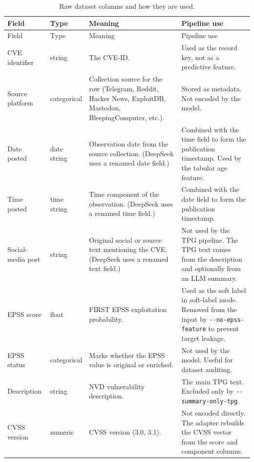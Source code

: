 \documentclass[11pt]{article}
\begin{document}
\small
\begin{longtable}{p{}p{}p{}p{}}
\caption{Raw dataset columns and how they are used.}\\
\toprule
Field & Type & Meaning & Pipeline use \\
\midrule
\endfirsthead
\toprule
Field & Type & Meaning & Pipeline use \\
\midrule
\endhead
\bottomrule
\endfoot

CVE identifier & string & The CVE-ID. & Used as the record key, not as a predictive feature. \\

Source platform & categorical & Collection source for the row (Telegram, Reddit, Hacker News, ExploitDB, Mastodon, BleepingComputer, etc.). & Stored as metadata. Not encoded by the model. \\

Date posted & date string & Observation date from the source collection. (DeepSeek uses a renamed date field.) & Combined with the time field to form the publication timestamp. Used by the tabular age feature. \\

Time posted & time string & Time component of the observation. (DeepSeek uses a renamed time field.) & Combined with the date field to form the publication timestamp. \\

Social-media post & string & Original social or source text mentioning the CVE. (DeepSeek uses a renamed text field.) & Not used by the TPG pipeline. The TPG text comes from the description and optionally from an LLM summary. \\

EPSS score & float & FIRST EPSS exploitation probability. & Used as the soft label in soft-label mode. Removed from the input by \verb|--no-epss-feature| to prevent target leakage. \\

EPSS status & categorical & Marks whether the EPSS value is original or enriched. & Not used by the model. Useful for dataset auditing. \\

Description & string & NVD vulnerability description. & The main TPG text. Excluded only by \verb|--summary-only-tpg|. \\

CVSS version & numeric & CVSS version (3.0, 3.1). & Not encoded directly. The adapter rebuilds the CVSS vector from the score and component columns. \\


\end{longtable}
\end{document}
